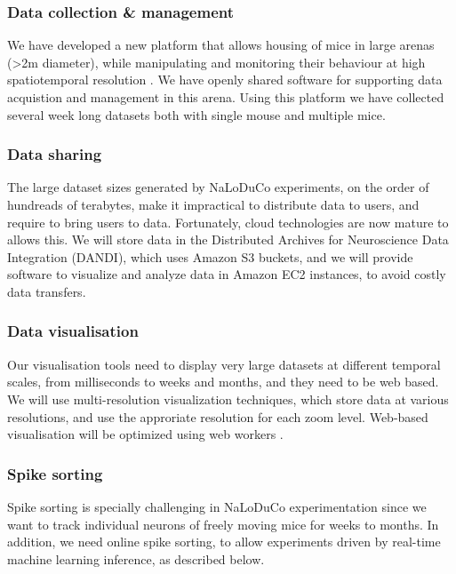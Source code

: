 \subsubsection{Data collection \& management}

We have developed a new platform that allows housing of mice in large arenas
(\textgreater 2m diameter), while manipulating and monitoring their behaviour
at high spatiotemporal resolution \citep[Figure~\ref{fig:arena}, ][]{campagnerEtAl24}.
%
We have openly shared software for supporting data acquistion
\citep{aeonacquisition} and management \citep{aeonmecha} in this
arena.
%
Using this platform we have collected several week long datasets both with
single mouse and multiple mice.



\subsubsection{Data sharing}

The large dataset sizes generated by NaLoDuCo experiments, on the order of
hundreads of terabytes,  make it impractical to distribute data to users, and
require to bring users to data. Fortunately, cloud technologies are now mature
to allows this.
%
We will store data in the Distributed Archives for Neuroscience Data
Integration (DANDI), which uses Amazon S3 buckets, and we will provide software
to visualize and analyze data in Amazon EC2 instances, to avoid costly data
transfers.

\subsubsection{Data visualisation}

Our visualisation tools
need to display very large datasets at different temporal scales, from
milliseconds to weeks and months, and they need to be web based.
%
We will use multi-resolution visualization techniques, which store data at
various resolutions, and use the approriate resolution for each zoom level.
%
Web-based visualisation will be optimized using web workers
\citep{webWorkers}.

\subsubsection{Spike sorting}

Spike sorting is specially challenging in NaLoDuCo experimentation since we
want to track individual neurons of freely moving mice for weeks to months.
%
In addition, we need online spike sorting, to allow experiments driven
by real-time machine learning inference, as described below.


